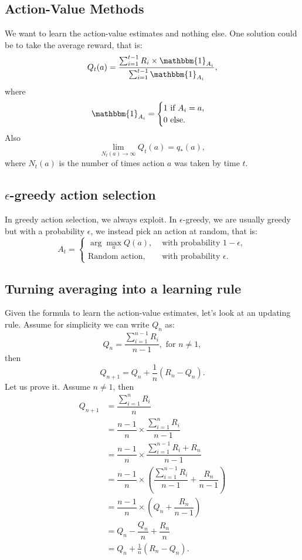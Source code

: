 \documentclass[12pt,a4paper]{report}
\begin{document}
	\subsection*{Action-Value Methods}
	We want to learn the action-value estimates and nothing else. One solution could be to take the average reward, that is:
	$$Q_t(a) = \dfrac{\sum_{i=1}^{t-1} R_i \times \mathbbm{1}_{A_i}}{\sum_{i=1}^{t-1} \mathbbm{1}_{A_i }},$$
	where
	$$\mathbbm{1}_{A_i} = \begin{cases}
		1 \text{ if } A_i = a, \\ 0 \text{ else}.
	\end{cases}$$
	Also $$\lim_{N_t(a) \rightarrow \infty} Q_t(a) = q_{*}(a),$$
	where $N_t(a)$ is the number of times action $a$ was taken by time $t$.
	
	\subsection*{$\epsilon$-greedy action selection}
	In greedy action selection, we always exploit. In $\epsilon$-greedy, we are usually greedy but with a probability $\epsilon$, we instead pick an action at random, that is:
	$$A_t = \begin{cases}
		\arg\max_{a} Q(a), &\text{ with probability } 1 - \epsilon, \\
		\text{Random action}, &\text{ with probability } \epsilon.
	\end{cases}$$

	\subsection*{Turning averaging into a learning rule}
	Given the formula to learn the action-value estimates, let's look at an updating rule. Assume for simplicity we can write $Q_n$ as:
	$$Q_n = \dfrac{\sum_{i=1}^{n-1} R_i}{n-1}, \text{ for } n \neq 1,$$
	then
	$$Q_{n+1} = Q_n + \frac{1}{n}(R_n - Q_n).$$
	Let us prove it. Assume $n \neq 1$, then
	\begin{align*}
		Q_{n+1} &= \dfrac{\sum_{i=1}^{n} R_i}{n}\\
		&= \dfrac{n-1}{n}\times\dfrac{\sum_{i=1}^{n} R_i}{n-1}\\
		&= \dfrac{n-1}{n}\times\dfrac{\sum_{i=1}^{n-1} R_i + R_n}{n-1}\\
		&= \dfrac{n-1}{n}\times\left(\dfrac{\sum_{i=1}^{n-1} R_i}{n-1} + \dfrac{R_n}{n-1}\right)\\
		&= \dfrac{n-1}{n}\times\left(Q_n + \dfrac{R_n}{n-1}\right)\\
		&= Q_n - \dfrac{Q_n}{n} + \dfrac{R_n}{n}\\
		&= Q_n + \frac{1}{n}(R_n - Q_n).
	\end{align*}
\end{document}

